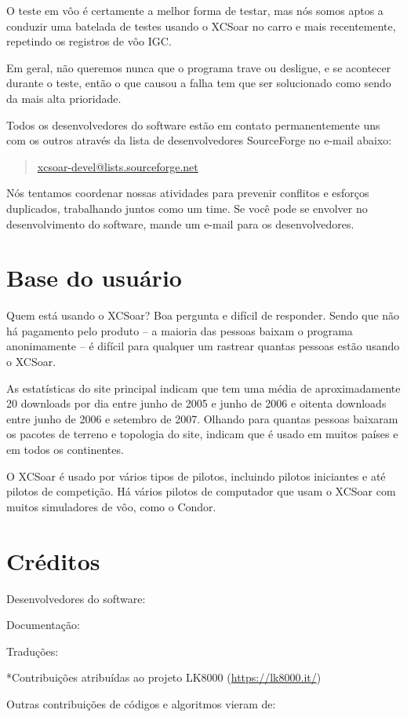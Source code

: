 O teste em vôo é certamente a melhor forma de testar, mas nós somos aptos a conduzir uma batelada de testes usando o XCSoar no carro e mais recentemente, repetindo os registros de vôo IGC.

Em geral, não queremos nunca que o programa trave ou desligue, e se acontecer durante o teste, então o que causou a falha tem que ser solucionado como sendo da mais alta prioridade.

Todos os desenvolvedores do software estão em contato permanentemente uns com os outros através da lista de desenvolvedores SourceForge no e-mail abaixo:

\begin{quote}
\url{xcsoar-devel@lists.sourceforge.net}
\end{quote}
Nós tentamos coordenar nossas atividades para prevenir conflitos e esforços duplicados, trabalhando juntos como um time.  Se você pode se envolver no desenvolvimento do software, mande um e-mail para os desenvolvedores.


\section{Base do usuário}

Quem está usando o XCSoar?  Boa pergunta e difícil de responder.  Sendo que não há pagamento pelo produto – a maioria das pessoas baixam o programa anonimamente – é difícil para qualquer um rastrear quantas pessoas estão usando o XCSoar.  

As estatísticas do site principal indicam que tem uma média de aproximadamente 20 downloads por dia entre junho de 2005 e junho de 2006 e oitenta downloads entre junho de 2006 e setembro de 2007.  Olhando para quantas pessoas baixaram os pacotes de terreno e topologia do site, indicam que é usado em muitos países e em todos os continentes.

O XCSoar é usado por vários tipos de pilotos, incluindo pilotos iniciantes e até pilotos de competição.  Há vários pilotos de computador que usam o XCSoar com muitos simuladores de vôo, como o Condor.



\section{Créditos}\label{sec:credits}

Desenvolvedores do software:
\begin{itemize}
  
\end{itemize}


Documentação:
\begin{itemize}
  
\end{itemize}


Traduções:
\begin{itemize}
  
\end{itemize}
*Contribuições atribuídas ao projeto LK8000 (\url{https://lk8000.it/})


Outras contribuições de códigos e algoritmos vieram de:
\begin{description}
  
\end{description}

